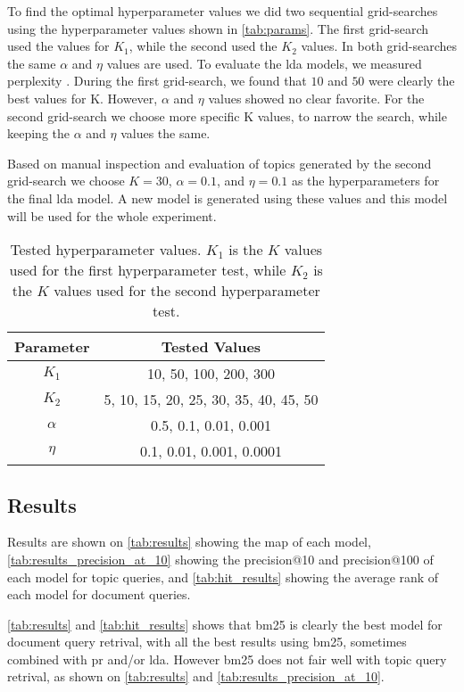 To find the optimal hyperparameter values we did two sequential grid-searches using the hyperparameter values shown in \autoref{tab:params}.
The first grid-search used the values for $K_1$, while the second used the $K_2$ values.
In both grid-searches the same $\alpha$ and $\eta$ values are used.
To evaluate the \gls{lda} models, we measured perplexity .
During the first grid-search, we found that $10$ and $50$ were clearly the best values for K.
However, $\alpha$ and $\eta$ values showed no clear favorite.
For the second grid-search we choose more specific K values, to narrow the search, while keeping the $\alpha$ and $\eta$ values the same.

Based on manual inspection and evaluation of topics generated by the second grid-search we choose $K = 30$, $\alpha = 0.1$, and $\eta = 0.1$ as the hyperparameters for the final \gls{lda} model.
A new model is generated using these values and this model will be used for the whole experiment.

\begin{table}[h]
	\centering
	\begin{tabular}{c|c}
		Parameter & Tested Values\\
		\hline
		$K_1$ & 10, 50, 100, 200, 300\\
		$K_2$ & 5, 10, 15, 20, 25, 30, 35, 40, 45, 50\\
		$\alpha$ & 0.5, 0.1, 0.01, 0.001\\
		$\eta$ & 0.1, 0.01, 0.001, 0.0001\\
	\end{tabular}
	\caption{Tested hyperparameter values. $K_1$ is the $K$ values used for the first hyperparameter test, while $K_2$ is the $K$ values used for the second hyperparameter test.}
	\label{tab:params}
\end{table}


\subsection{Results}\label{subsec:results}

Results are shown on \autoref{tab:results} showing the \gls{map} of each model, \autoref{tab:results_precision_at_10} showing the precision@10 and precision@100 of each model for topic queries, and \autoref{tab:hit_results} showing the average rank of each model for document queries.

\autoref{tab:results} and \autoref{tab:hit_results} shows that \gls{bm25} is clearly the best model for document query retrival, with all the best results using \gls{bm25}, sometimes combined with \gls{pr} and/or \gls{lda}. However \gls{bm25} does not fair well with topic query retrival, as shown on \autoref{tab:results} and \autoref{tab:results_precision_at_10}.

